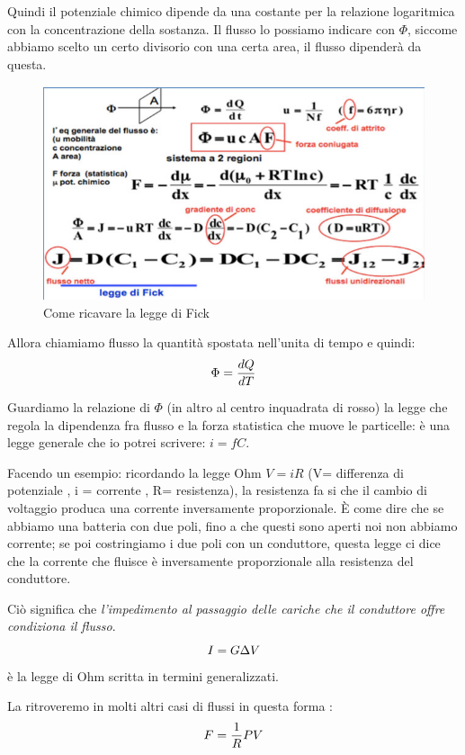 \documentclass[a4paper,12pt]{article}
\begin{document}
Quindi il potenziale chimico dipende da una costante per la relazione logaritmica con la concentrazione della sostanza.
Il flusso lo possiamo indicare con $\Phi$, siccome abbiamo scelto un certo divisorio con una certa area, il flusso dipenderà da questa.
\begin{figure}[H]
\centering
\includegraphics[scale=0.5]{immagine/conti.jpg}
\caption{Come ricavare la legge di Fick}
\end{figure}
Allora chiamiamo flusso la quantità spostata nell'unita di tempo e quindi: 
\begin{equation}
\centering
\Phi=\frac{dQ}{dT}
\end{equation}

Guardiamo la relazione di $\Phi$ (in altro al centro inquadrata di rosso) la legge che regola la dipendenza fra flusso e la forza statistica che muove le particelle: è una legge generale che io potrei scrivere: $i = fC$.
  
Facendo un esempio: ricordando la legge Ohm $V=i R$ (V= differenza di potenziale , i = corrente , R= resistenza), la resistenza fa si che il cambio di voltaggio produca una corrente inversamente proporzionale. È come dire che se abbiamo una batteria con due poli, fino a che questi sono aperti noi non abbiamo corrente; se poi costringiamo i due poli con un conduttore, questa legge ci dice che la corrente che fluisce è inversamente proporzionale alla resistenza del conduttore.

Ciò significa che \emph{l'impedimento al passaggio delle cariche che il conduttore offre condiziona il flusso}.
\begin{equation}
\centering
I=G \Delta V
\end{equation}
è la legge di Ohm scritta in termini generalizzati.

La ritroveremo in molti altri casi di flussi in questa forma :
\begin{equation}
\centering
F=\frac{1}{R} PV 
\end{equation}
\end{document}
